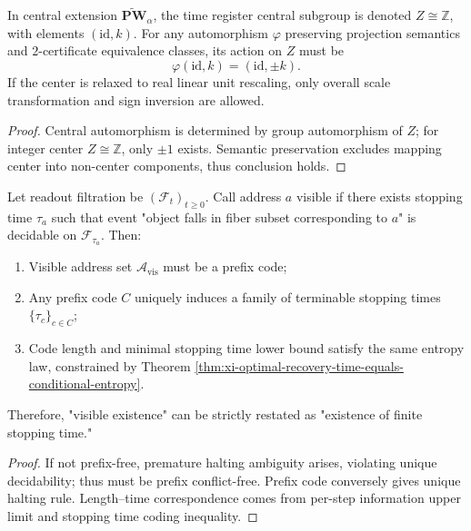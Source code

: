 \begin{theorem}\label{thm:xi-time-center-semantic-rigidity}
In central extension \(\widetilde{\mathbf{PW}}_{\alpha}\), the time register central subgroup is denoted
\(
Z\cong\mathbb Z
\), with elements \((\mathrm{id},k)\).
For any automorphism \(\varphi\) preserving projection semantics and \(2\)-certificate equivalence classes, its action on \(Z\) must be
\[
\varphi(\mathrm{id},k)=(\mathrm{id},\pm k).
\]
If the center is relaxed to real linear unit rescaling, only overall scale transformation and sign inversion are allowed.
\end{theorem}

\begin{proof}
Central automorphism is determined by group automorphism of \(Z\); for integer center \(Z\cong\mathbb Z\), only \(\pm1\) exists.
Semantic preservation excludes mapping center into non-center components, thus conclusion holds.
\end{proof}

\begin{theorem}\label{thm:xi-address-stopping-time-equivalence}
Let readout filtration be \((\mathcal F_t)_{t\ge 0}\).
Call address \(a\) visible if there exists stopping time \(\tau_a\) such that event "object falls in fiber subset corresponding to \(a\)" is decidable on \(\mathcal F_{\tau_a}\).
Then:
\begin{enumerate}
  \item Visible address set \(\mathcal A_{\mathrm{vis}}\) must be a prefix code;
  \item Any prefix code \(C\) uniquely induces a family of terminable stopping times \(\{\tau_c\}_{c\in C}\);
  \item Code length and minimal stopping time lower bound satisfy the same entropy law, constrained by Theorem \ref{thm:xi-optimal-recovery-time-equals-conditional-entropy}.
\end{enumerate}
Therefore, "visible existence" can be strictly restated as "existence of finite stopping time."
\end{theorem}

\begin{proof}
If not prefix-free, premature halting ambiguity arises, violating unique decidability; thus must be prefix conflict-free.
Prefix code conversely gives unique halting rule.
Length--time correspondence comes from per-step information upper limit and stopping time coding inequality.
\end{proof}

